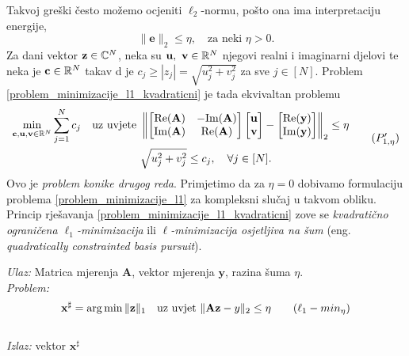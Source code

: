 \documentclass[a4paper,twoside,12pt]{memoir} %
\newcommand{\vect}[1]{\mathbf{#1}}
\renewcommand{\vec}{\vect}
\newcommand{\norm}[1]{\|{#1}\|}
\newcommand{\norms}[1]{\left\lVert#1\right\rVert}
\DeclareMathOperator*{\argmin}{arg\,min}
\renewcommand{\Re}{\text{\normalfont{Re}}}
\renewcommand{\Im}{\text{\normalfont{Im}}}
\newenvironment{alg}[1]
{
    \bigskip
    \begin{tcolorbox}[arc=0mm,boxrule=1.2pt,colframe=black,colback=white,detach title, before upper={\medskip\begin{center}\textbf{#1}\end{center}\hline\newline\medskip},frame hidden]
    \medskip
}
{
    \medskip
\end{tcolorbox}
    \bigskip
}
\begin{document}
Takvoj gre\v{s}ki \v{c}esto mo\v{z}emo ocjeniti $\ell_2$-normu, po\v{s}to ona ima interpretaciju energije,
\begin{equation*}
    \norm{\vec e}_2 \leq \eta, \quad \text{za neki } \eta > 0.
\end{equation*}
Za dani vektor $\vec z \in \C^N$, neka su $\vec u,\ \vec v \in \R^N$ njegovi realni i imaginarni djelovi te neka je $\vec c \in \R^N$ takav d je $c_j \geq |z_j| = \sqrt{u_j^2+v_j^2}$ za sve $j \in [N]$. Problem \eqref{problem_minimizacije_l1_kvadraticni} je tada ekvivaltan problemu
\begin{equation}
\begin{split}
    \min_{\vec c, \vec u, \vec v \in \R^N}\sum_{j=1}^N c_j\quad \text{uz uvjete }& 
    \norms{
        \begin{bmatrix*}
            \Re(\vec A) & -\Im(\vec A) \\
            \Im(\vec A) & \Re(\vec A)
        \end{bmatrix*}
        \begin{bmatrix*}
           \vec u \\ \vec v 
        \end{bmatrix*}
        -
        \begin{bmatrix*}
            \Re(\vec y) \\ \Im(\vec y) 
    \end{bmatrix*} }_2 \leq \eta \\
    &\sqrt{u_j^2 + v_j^2} \leq c_j,\quad \forall j \in [N].
\end{split}\tag{$P_{1, \eta}'$}\label{problem_minimizacije_l1_kvadraticni_drugi_oblik}
\end{equation}
Ovo je \textit{problem konike drugog reda}. Primjetimo da za $\eta=0$ dobivamo formulaciju problema \eqref{problem_minimizacije_l1} za kompleksni slu\v{c}aj u takvom obliku.
\\\indent Princip rje\v{s}avanja \eqref{problem_minimizacije_l1_kvadraticni} zove se \textit{kvadrati\v{c}no ograni\v{c}ena $\ell_1$-minimizacija} ili \textit{$\ell$-minimizacija osjetljiva na \v{s}um} (eng. \textit{quadratically constrainted basis pursuit}).
\begin{alg}{Kvadrati\v{c}no ograni\v{c}ena $\ell_1$-minimizacija}
    \textit{Ulaz:} Matrica mjerenja $\vec A$, vektor mjerenja $\vec y$, razina \v{s}uma $\eta$. \\
    \textit{Problem:}
        \begin{equation}
            \vec x^{\sharp} = \argmin \norm{\vec z}_1 \quad \text{uz uvjet }\norm{\vec{Az}-y}_2 \leq \eta\tag{$\ell_1-min_{\eta}$}\label{algoritam_l1_minimizacija_kvadraticna}
        \end{equation} \\
        \textit{Izlaz:} vektor $\vec x^{\sharp}$
\end{alg}
\end{document}
